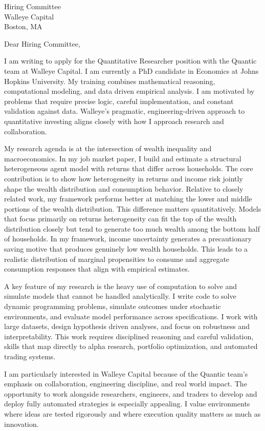\documentclass[11pt]{letter}
\begin{document}
\begin{letter}{Hiring Committee \\ Walleye Capital \\ Boston, MA}

\opening{Dear Hiring Committee,}

I am writing to apply for the Quantitative Researcher position with the Quantic team at Walleye Capital. I am currently a PhD candidate in Economics at Johns Hopkins University. My training combines mathematical reasoning, computational modeling, and data driven empirical analysis. I am motivated by problems that require precise logic, careful implementation, and constant validation against data. Walleye’s pragmatic, engineering-driven approach to quantitative investing aligns closely with how I approach research and collaboration.

My research agenda is at the intersection of wealth inequality and macroeconomics. In my job market paper, I build and estimate a structural heterogeneous agent model with returns that differ across households. The core contribution is to show how heterogeneity in returns and income risk jointly shape the wealth distribution and consumption behavior. Relative to closely related work, my framework performs better at matching the lower and middle portions of the wealth distribution. This difference matters quantitatively. Models that focus primarily on returns heterogeneity can fit the top of the wealth distribution closely but tend to generate too much wealth among the bottom half of households. In my framework, income uncertainty generates a precautionary saving motive that produces genuinely low wealth households. This leads to a realistic distribution of marginal propensities to consume and aggregate consumption responses that align with empirical estimates.

A key feature of my research is the heavy use of computation to solve and simulate models that cannot be handled analytically. I write code to solve dynamic programming problems, simulate outcomes under stochastic environments, and evaluate model performance across specifications. I work with large datasets, design hypothesis driven analyses, and focus on robustness and interpretability. This work requires disciplined reasoning and careful validation, skills that map directly to alpha research, portfolio optimization, and automated trading systems.

I am particularly interested in Walleye Capital because of the Quantic team’s emphasis on collaboration, engineering discipline, and real world impact. The opportunity to work alongside researchers, engineers, and traders to develop and deploy fully automated strategies is especially appealing. I value environments where ideas are tested rigorously and where execution quality matters as much as innovation.


\end{letter}
\end{document}

